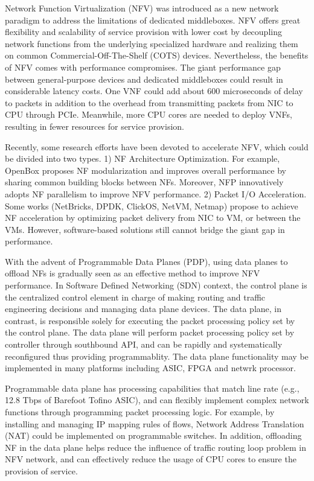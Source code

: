 \documentclass[10pt, conference, letterpaper]{IEEEtran}
\begin{document}
Network Function Virtualization (NFV) was introduced as a new network paradigm to address the limitations of dedicated middleboxes. NFV offers great flexibility and scalability of service provision with lower cost by decoupling network functions from the underlying specialized hardware and realizing them on common Commercial-Off-The-Shelf (COTS) devices.
Nevertheless, the benefits of NFV comes with performance compromises. The giant performance gap between general-purpose devices and dedicated middleboxes could result in considerable latency costs. 
One VNF could add about 600 microseconds of delay to packets in addition to the overhead from transmitting packets from NIC to CPU through PCIe.
Meanwhile, more CPU cores are needed to deploy VNFs, resulting in fewer resources for service provision\cite{Pontarelli2019}.

Recently, some research efforts have been devoted to accelerate NFV, which could be divided into two types. 
1) NF Architecture Optimization. For example, OpenBox proposes NF modularization and improves overall performance by sharing common building blocks between NFs. Moreover, NFP innovatively adopts NF parallelism to improve NFV performance. 
2) Packet I/O Acceleration. Some works (NetBricks, DPDK, ClickOS, NetVM, Netmap) propose to achieve NF acceleration by optimizing packet delivery from NIC to VM, or between the VMs.
However, software-based solutions still cannot bridge the giant gap in performance.

With the advent of Programmable Data Planes (PDP), using data planes to offload NFs is gradually seen as an effective method to improve NFV performance. 
In Software Defined Networking (SDN) context, the control plane is the centralized control element in charge of making routing and traffic engineering decisions and managing data plane devices. The data plane, in contrast, is responsible solely for executing the packet processing policy set by the control plane. The data plane will perform packet processing policy set by controller through southbound API, and can be rapidly and systematically reconfigured thus providing programmablity\cite{bifulco2018survey}. The data plane functionality may be implemented in many platforms including ASIC, FPGA and netwrk processor.

Programmable data plane has processing capabilities that match line rate (e.g., 12.8 Tbps of Barefoot Tofino ASIC), and can flexibly implement complex network functions through programming packet processing logic. For example, by installing and managing IP mapping rules of flows, Network Address Translation (NAT) could be implemented on programmable switches. In addition, offloading NF in the data plane helps reduce the influence of traffic routing loop problem in NFV network, and can effectively reduce the usage of CPU cores to ensure the provision of service.
\end{document}
